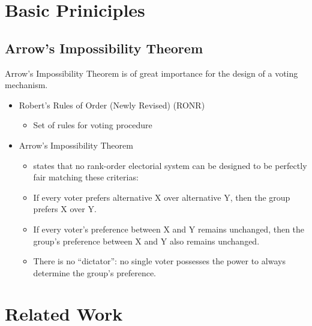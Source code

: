 \documentclass[conference]{IEEEtran}
\begin{document}
\section{Basic Priniciples}\label{2BasicPrinciples}

\subsection{Arrow's Impossibility Theorem}
Arrow's Impossibility Theorem is of great importance for the design of a voting mechanism. 

\begin{itemize}
    \item Robert's Rules of Order (Newly Revised) (RONR)
    \begin{itemize}
        \item Set of rules for voting procedure
    \end{itemize}
    \item Arrow's Impossibility Theorem
    \begin{itemize}
        \item states that no rank-order electorial system can be designed to be perfectly fair matching these criterias:
        \item If every voter prefers alternative X over alternative Y, then the group prefers X over Y.
        \item If every voter’s preference between X and Y remains unchanged, then the group’s preference between X and Y also remains unchanged.
        \item There is no “dictator”: no single voter possesses the power to always determine the group’s preference.
    \end{itemize}
\end{itemize}

\section{Related Work}\label{3RelatedWork}




\vspace{12pt}
\end{document}
